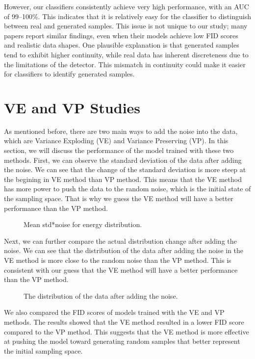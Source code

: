 However, our classifiers consistently achieve very high performance, with an AUC of 99--100\%. This indicates that it is relatively easy for the classifier to distinguish between real and generated samples. This issue is not unique to our study; many papers report similar findings, even when their models achieve low FID scores and realistic data shapes. One plausible explanation is that generated samples tend to exhibit higher continuity, while real data has inherent discreteness due to the limitations of the detector. This mismatch in continuity could make it easier for classifiers to identify generated samples.


\section{VE and VP Studies}
As mentioned before, there are two main ways to add the noise into the data, which are Variance Exploding (VE) and Variance Preserving (VP). In this section, we will discuss the performance of the model trained with these two methods. First, we can observe the standard deviation of the data after adding the noise. We can see that the change of the standard deviation is more steep at the begining in VE method than VP method. This means that the VE method has more power to push the data to the random noise, which is the initial state of the sampling space. That is why we guess the VE method will have a better performance than the VP method.

\begin{figure}[h!]
    \centering
    \caption{Mean std*noise for energy distribution.}
\end{figure}

Next, we can further compare the actual distribution change after adding the noise. We can see that the distribution of the data after adding the noise in the VE method is more close to the random noise than the VP method. This is consistent with our guess that the VE method will have a better performance than the VP method.

\begin{figure}[h!]
    \centering
    \caption{The distribution of the data after adding the noise.}
\end{figure}

We also compared the FID scores of models trained with the VE and VP methods. The results showed that the VE method resulted in a lower FID score compared to the VP method. This suggests that the VE method is more effective at pushing the model toward generating random samples that better represent the initial sampling space.

